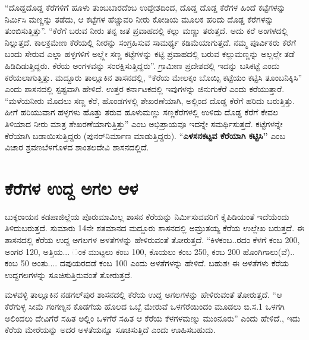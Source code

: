 “ದೊಡ್ಡದೊಡ್ಡ ಕೆರೆಗಳಿಗೆ ಹೂಳು ತುಂಬಬಾರದೆಂಬ ಉದ್ದೇಶದಿಂದ, ದೊಡ್ಡ ದೊಡ್ಡ ಕೆರೆಗಳ ಹಿಂದೆ ಕಟ್ಟೆಗಳನ್ನು ನಿರ್ಮಿಸಿ ಮಣ್ಣನ್ನು ತಡೆದು, ಆ ಕಟ್ಟೆಗಳ ಹೆಚ್ಚುವರಿ ನೀರು ಕೋಡಿಯ ಮೂಲಕ ಹರಿದು ದೊಡ್ಡ ಕೆರೆಗಳನ್ನು ತುಂಬಿಸುತ್ತಿತ್ತು”. “ಕೆರೆಗೆ ಬರುವ ನೀರು ತನ್ನ ಜತೆ ಪ್ರವಾಹದಲ್ಲಿ ಕಲ್ಲು ಮಣ್ಣು ತರುತ್ತದೆ. ಅದು ಕರೆ ಅಂಗಳದಲ್ಲಿ ನಿಲ್ಲುತ್ತದೆ. ಕಾಲಕ್ರಮೇಣ ಕೆರೆಯಲ್ಲಿ ನೀರನ್ನು ಸಂಗ್ರಹಿಸುವ ಸಾಮರ್ಥ್ಯ ಕಡಿಮೆಯಾಗುತ್ತದೆ. ನಮ್ಮ ಪೂರ್ವಿಕರು ಕೆರೆಗೆ ಬಂದು ಸೇರುವ ಎಲ್ಲಾ ಹಳ್ಳಗಳಿಗೆ ಅಲ್ಲ್ಲೇ ಸಣ್ಣ ಕಟ್ಟೆಗಳನ್ನು ಕಟ್ಟಿ ಪ್ರವಾಹದಲ್ಲಿ ಬರುವ ಕಲ್ಲುಮಣ್ಣನ್ನು ಅಲ್ಲಲ್ಲೇ ತಡೆ ಹಿಡಿದಿಡುತ್ತಿದ್ದರು. ಕೆರೆಯ ಅಂಗಳವನ್ನು ಸಂರಕ್ಷಿಸುತ್ತಿದ್ದರು”. ಗ್ರಾಮೀಣ ಪ್ರದೇಶದಲ್ಲಿ ಇದನ್ನು ಬಸಿಕಟ್ಟೆ ಎಂದು ಕರೆಯಲಾಗುತ್ತಿತ್ತು. ಮದ್ದೂರು ತಾಲ್ಲೂಕಿನ ಶಾಸನದಲ್ಲಿ, “ಕೆರೆಯ ಮೇಲಕ್ಕಂ ಬೊಯ್ಸಿ ಕಟ್ಟೆಯಂ ಕಟ್ಟಿಸಿ ತೂಂಬನಿಕ್ಕಿಸಿ” ಎಂದು ಶಾಸನದಲ್ಲಿ ಸ್ಪಷ್ಟವಾಗಿ ಹೇಳಿದೆ. ಉತ್ತರ ಕರ್ನಾಟಕದಲ್ಲಿ ಇವುಗಳನ್ನು ಜಿನುಗುಕೆರೆ ಎಂದು ಕರೆಯುತ್ತಾರೆ. “ಮಳೆಯನೀರು ಮೊದಲು ಸಣ್ಣ ಕೆರೆ, ಹೊಂಡಗಳಲ್ಲಿ ಶೇಖರಣೆಯಾಗಿ, ಅಲ್ಲಿಂದ ದೊಡ್ಡ ಕೆರೆಗೆ ಹರಿದು ಬರುತ್ತಿತ್ತು. ಹೀಗೆ ಹರಿಯುವಾಗ ಹಳ್ಳಗಳು ಹೊತ್ತು ತರುವ ಹೂಳುಮಣ್ಣು ಸಣ್ಣಕೆರೆಗಳಲ್ಲಿ ಉಳಿದು ದೊಡ್ಡ ಕೆರೆಗೆ ಕೇವಲ ತಿಳಿಯಾದ ನೀರು ಮಾತ್ರ ಶೇಖರಣೆಯಾಗುತ್ತಿತ್ತು” ಎಂಬ ಅಭಿಪ್ರಾಯವೂ ಇದನ್ನೇ ಸಮರ್ಥಿಸುತ್ತದೆ. ಕಟ್ಟೆಗಳನ್ನೇ ಕೆರೆಯಾಗಿ ಬಡಾಯಿಸುತ್ತಿದ್ದರು (ಪುನರ್​ನಿರ್ಮಾಣ ಮಾಡುತ್ತಿದ್ದರು). “\textbf{ಎಳಸನಕಟ್ಟವ ಕೆರೆಯಾಗಿ ಕಟ್ಟಿಸಿ”} ಎಂಬ ವಿಚಾರ ಶ್ರವಣಬೆಳಗೊಳದ ಶಾಂತಲದೇವಿ ಶಾಸನದಲ್ಲಿದೆ.


\section{ಕೆರೆಗಳ ಉದ್ದ ಅಗಲ ಆಳ}

ಬುಕ್ಕರಾಯನ ಕಡಪಾಜಿಲ್ಲೆಯ ಪೊರುಮಾಮಿಲ್ಲ ಶಾಸನ ಕೆರೆಯನ್ನು ನಿರ್ಮಿಸುವವರಿಗೆ ಕೈಪಿಡಿಯಂತೆ ಇದೆಯೆಂದು ತಿಳಿದುಬರುತ್ತದೆ. ಸುಮಾರು 14ನೇ ಶತಮಾನದ ಮದ್ದೂರು ಶಾಸನದಲ್ಲಿ ಅಮ್ರುತಯ್ಯ ಕೆರೆಯ ಉಲ್ಲೇಖ ಬರುತ್ತದೆ. ಈ ಶಾಸನದಲ್ಲಿ ಕೆರೆಯ ಉದ್ದ ಅಗಲಗಳ ಅಳತೆಗಳನ್ನು ಹೇಳಿರುವಂತೆ ತೋರುತ್ತದೆ. “ಕಿಳಕಂಬ..ರದಂ ಕೆಳಗೆ ಕಂಬ 200, ಅಂಗರ 120, ಅತ್ತಿಯ... ಂಕ ಮುಟ್ಟಲು ಕಂಬ 100, ಕೊಯಲು ಕಂಬ 250, ಕಂಬ 200 ಹೊಂಗಿಗಾಲು(ವೆ).. ಕಂಬ 50 ಅಂತು.... ದಪುಯರದಡೆ ಕಂಬ 100 ಎಂದು ಅಳತೆಗಳನ್ನು ಹೇಳಿದೆ. ಬಹುಶಃ ಈ ಅಳತೆಗಳು ಕೆರೆಯ ಉದ್ದಗಲಗಳನ್ನು ಸೂಚಿಸುತ್ತಿರುವಂತೆ ತೋರುತ್ತದೆ.

ಮಳವಳ್ಳಿ ತಾಲ್ಲೂಕಿನ ನಡಗಲ್​ಪುರ ಶಾಸನದಲ್ಲಿ ಕೆರೆಯ ಉದ್ದ ಅಗಲಗಳನ್ನು ಹೇಳಿರುವಂತೆ ತೋರುತ್ತದೆ. “ಆ ಕೆರೆಗುಳ್ಳ ಸೀಮೆ ಗಂಗಣ್ನನ ಕೊಡಗೆಯ ಹೊಲದ ಒಬ್ಬೆ ಮೇರುವೆ ಒಳಗೆರೆಯಿಂದಂ ಮೂಡಲು ಬಿ.ಸ.1 ಒಳಗಗಿ ಅಲಿಂದಲು ದೇವಿಗೆರೆ ಸಹಿತ ಅಲ್ಲಿಂ ಒಳಗೆರೆ ಸಹಿತ ಆ ಕೆರೆಯ ಕೆಳಗಳಮಣ್ನು ಮುಂನೂರು” ಎಂದು ಹೇಳಿದೆ., ಇದು ಕೆರೆಯ ಮೇರೆಯನ್ನು ಅದರ ಅಳತೆಯನ್ನೂ ಸೂಚಿಸುತ್ತಿದೆ ಎಂದು ಊಹಿಸಬಹುದು.


